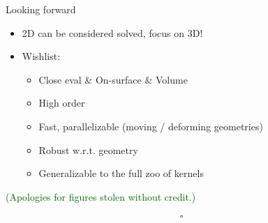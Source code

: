 \documentclass[t]{beamer}
\newcommand{\who}[1]{{\scriptsize \textcolor{darkgreen}{(#1)}}}  %
\begin{document}
\begin{frame}{Looking forward}
  \begin{itemize}
  \item 2D can be considered solved, focus on 3D!
  \item Wishlist:
    \begin{itemize}
    \item Close eval \& On-surface \& Volume
    \item High order
    \item Fast, parallelizable (moving / deforming geometries)
    \item Robust w.r.t. geometry
    \item Generalizable to the full zoo of kernels
    \end{itemize}
  \end{itemize}
  \vfill
  \who{Apologies for figures stolen without credit.}
\end{frame}

\begin{frame}[c]
  \begin{align}
    \square
  \end{align}
\end{frame}
\end{document}
